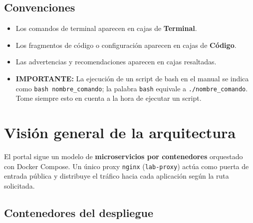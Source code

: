 \documentclass[12pt,a4paper]{report}
\begin{document}
\section{Convenciones}

\begin{itemize}
  \item Los comandos de terminal aparecen en cajas de \textbf{Terminal}.
  \item Los fragmentos de código o configuración aparecen en cajas de
        \textbf{Código}.
  \item Las advertencias y recomendaciones aparecen en cajas resaltadas.
  \item \textbf{IMPORTANTE: } La ejecución de un script de bash en el manual se indica como \texttt{bash nombre\_comando}; la palabra \texttt{bash} equivale a \texttt{./nombre\_comando}. Tome siempre esto en cuenta a la hora de ejecutar un script. 
\end{itemize}

\chapter{Visión general de la arquitectura}

El portal sigue un modelo de \textbf{microservicios por contenedores}
orquestado con Docker Compose. Un único proxy \texttt{nginx}
(\texttt{lab-proxy}) actúa como puerta de entrada pública y distribuye el
tráfico hacia cada aplicación según la ruta solicitada.

\begin{center}
\end{center}

\section{Contenedores del despliegue}
\end{document}
